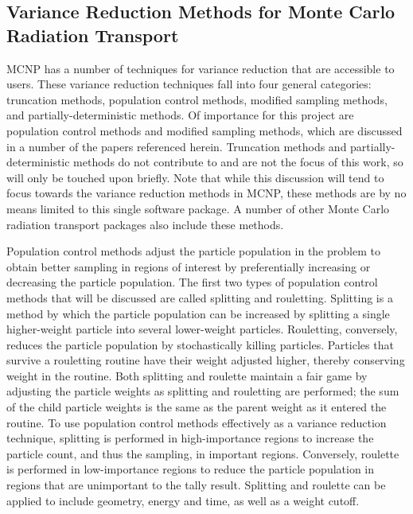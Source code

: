 \subsection{Variance Reduction Methods for Monte Carlo Radiation Transport}
\label{subsec:MCVR}
MCNP \cite{hendricks_mcnp_1985, brown_mcnp_2002, mcnp_manual_v1}
has a number of techniques for variance
reduction that are accessible to users. These variance reduction
techniques fall
into four general categories: truncation methods, population control methods, modified
sampling methods, and partially-deterministic methods. Of importance for this
project are
population control methods and modified sampling methods, which are discussed in
a number
of the papers referenced herein. Truncation methods and partially-deterministic
methods do not contribute to and are not the focus of this work,
so will only be touched upon briefly. Note that while this
discussion will tend to focus towards the variance reduction methods in MCNP,
these
methods are by no means limited to this single software package. A
number of other Monte Carlo radiation transport packages also include these
methods.

Population control methods adjust the particle population in the problem to
obtain better sampling in regions of interest by preferentially increasing or
decreasing the particle population.
The first two types of population control methods that will be discussed
are called splitting and rouletting.
Splitting is a method by which the particle population can be increased by
splitting a single higher-weight particle into several lower-weight particles.
Rouletting, conversely, reduces the particle population by stochastically
killing particles. Particles that survive a rouletting routine have their weight
adjusted higher, thereby conserving weight in the routine.
Both splitting and roulette maintain a
fair game by adjusting the particle weights as splitting and rouletting are
performed; the sum of the child particle weights is the same as the parent
weight as it entered the routine.
To use population control methods effectively as a variance reduction technique,
splitting is performed in high-importance regions to increase the particle
count, and thus the sampling, in important regions. Conversely, roulette is
performed in
 low-importance
  regions to reduce the particle population in regions that are unimportant to
  the tally result.
Splitting and roulette can be applied to include geometry, energy and time,
  as well as a weight cutoff.

